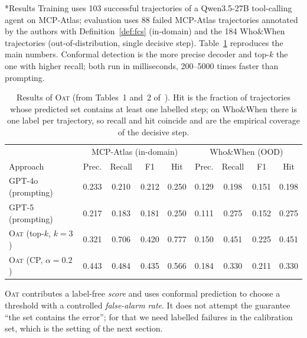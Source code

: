 \documentclass[11pt]{article}
\makeatletter
\theoremstyle{definition}
\renewcommand\subsection{\@startsection{subsection}{2}{\z@}{-3.25ex\@plus -1ex \@minus -.2ex}{1.5ex \@plus .2ex}{\normalfont\large\bfseries\color{secblue}}}
\makeatother
\begin{document}
\subsection*{Results}
Training uses 103 successful trajectories of a Qwen3.5-27B tool-calling agent on MCP-Atlas; evaluation uses 88 failed MCP-Atlas trajectories annotated by the authors with Definition~\ref{def:fcs} (in-domain) and the 184 Who\&When trajectories (out-of-distribution, single decisive step). Table~\ref{tab:oat} reproduces the main numbers. Conformal detection is the more precise decoder and top-$k$ the one with higher recall; both run in milliseconds, 200--5000 times faster than prompting.

\begin{table}[H]
\centering\small
\begin{tabular}{@{}lcccc@{\qquad}cccc@{}}\toprule
 & \multicolumn{4}{c}{MCP-Atlas (in-domain)} & \multicolumn{4}{c}{Who\&When (OOD)}\\
Approach & Prec. & Recall & F1 & Hit & Prec. & Recall & F1 & Hit\\\midrule
GPT-4o (prompting) & 0.233 & 0.210 & 0.212 & 0.250 & 0.129 & 0.198 & 0.151 & 0.198\\
GPT-5 (prompting) & 0.217 & 0.183 & 0.181 & 0.250 & 0.111 & 0.275 & 0.152 & 0.275\\
\textsc{Oat} (top-$k$, $k=3$) & 0.321 & 0.706 & 0.420 & 0.777 & 0.150 & 0.451 & 0.225 & 0.451\\
\textsc{Oat} (CP, $\alpha=0.2$) & 0.443 & 0.484 & 0.435 & 0.566 & 0.184 & 0.330 & 0.211 & 0.330\\\bottomrule
\end{tabular}
\caption{Results of \textsc{Oat} (from Tables~1 and~2 of~\cite{oat}). Hit is the fraction of trajectories whose predicted set contains at least one labelled step; on Who\&When there is one label per trajectory, so recall and hit coincide and are the empirical coverage of the decisive step.}
\label{tab:oat}
\end{table}

\begin{keybox}
\textsc{Oat} contributes a label-free \emph{score} and uses conformal prediction to choose a threshold with a controlled \emph{false-alarm rate}. It does not attempt the guarantee ``the set contains the error''; for that we need labelled failures in the calibration set, which is the setting of the next section.
\end{keybox}

\end{document}
